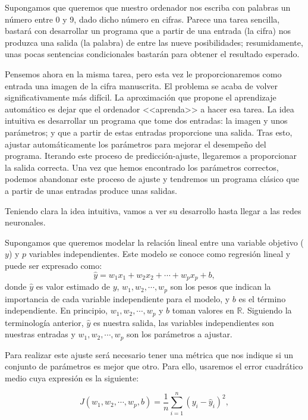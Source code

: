 \documentclass[12pt, a4paper, twoside]{book}
\numberwithin{equation}{section}
\theoremstyle{definition}
\theoremstyle{remark}
\theoremstyle{plain}
\begin{document}
	Supongamos que queremos que nuestro ordenador nos escriba con palabras
	un número entre 0 y 9, dado dicho número en cifras. Parece una tarea 
	sencilla, bastará con desarrollar un programa que a partir de una 
	entrada (la 
	cifra) nos produzca una salida (la palabra) de entre las nueve 
	posibilidades; resumidamente, unas pocas sentencias 
	condicionales bastarán para obtener el resultado esperado.  

	Pensemos ahora en la 
	misma tarea, pero esta vez le proporcionaremos como entrada una imagen
	de la cifra manuscrita. El problema se acaba de volver 
	significativamente más difícil. La aproximación que propone el 
	aprendizaje automático es dejar que el ordenador <<aprenda>> a hacer 
	esa tarea. La idea intuitiva es desarrollar un programa que tome dos 
	entradas: la imagen y unos parámetros; y que a partir de estas 
	entradas proporcione una salida. Tras esto, ajustar automáticamente 
	los parámetros para mejorar el desempeño del programa. Iterando este 
	proceso de predicción-ajuste, llegaremos a proporcionar la salida 
	correcta. Una vez que hemos encontrado los parámetros correctos,
	podemos abandonar este proceso de ajuste y tendremos un 
	programa clásico que a partir de unas entradas produce unas salidas.

	Teniendo clara la idea intuitiva, vamos a ver su desarrollo hasta 
	llegar a las redes neuronales.

	Supongamos que queremos modelar la relación lineal entre una variable
	objetivo ($y$) y $p$ variables independientes. Este modelo se conoce 
	como regresión lineal y puede ser expresado como:
	\begin{equation*}
		\hat{y}=w_{1}x_{1}+w_{2}x_{2}+\cdots+w_{p}x_{p}+b,
	\end{equation*}
	donde $\hat{y}$ es valor estimado de $y$, $w_{1},w_{2},\cdots,w_{p}$ 
	son los pesos que indican la importancia de cada variable 
	independiente para el modelo, y $b$ es el término independiente. En 
	principio, $w_{1},w_{2},\cdots,w_{p}$ y $b$ toman valores en 
	$\mathbb{R}$.
	Siguiendo la terminología anterior, $\hat{y}$ es nuestra salida, las 
	variables independientes son nuestras entradas y $w_{1},w_{2},\cdots,
	w_{p}$ son los parámetros a ajustar. 

	Para realizar este ajuste será necesario tener una métrica que nos 
	indique si un conjunto de parámetros es mejor que otro. Para ello,
	usaremos el error cuadrático medio cuya expresión es la siguiente:

	\begin{equation*}
		J(w_{1},w_{2},\cdots,w_{p},b)=\frac{1}{n}\sum_{i=1}^{n}(y_{i}-\hat{y}_{i})^2,
	\end{equation*}
\end{document}

